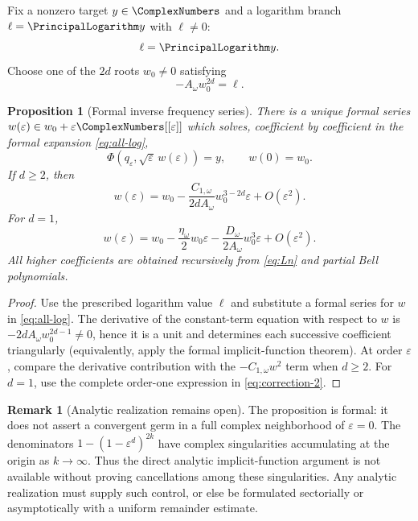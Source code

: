 \documentclass[11pt]{article}
\newtheorem{proposition}[theorem]{Proposition}
\theoremstyle{definition}
\newtheorem{remark}[theorem]{Remark}
\newcommand{\eps}{\varepsilon}
\begin{document}
Fix a nonzero target $y\in\ComplexNumbers$ and a logarithm branch $\ell=\PrincipalLogarithm y$ with $\ell\ne0$:
\begin{equation}
 \ell=\PrincipalLogarithm y.
 \label{eq:ell}
\end{equation}
Choose one of the $2d$ roots $w_0\ne0$ satisfying
\begin{equation}
 -A_\omega w_0^{2d}=\ell.
 \label{eq:w0}
\end{equation}

\begin{proposition}[Formal inverse frequency series]
There is a unique formal series
$w(\eps)\in w_0+\eps\ComplexNumbers[[\eps]]$ which solves, coefficient by coefficient in
the formal expansion \cref{eq:all-log},
\begin{equation}
 \Phi(q_\eps,\sqrt\eps\,w(\eps))=y,
 \qquad
 w(0)=w_0.
 \label{eq:inverse-w}
\end{equation}
If $d\ge2$, then
\begin{equation}
 \boxed{
 w(\eps)=w_0
 -\frac{C_{1,\omega}}{2dA_\omega}
 w_0^{3-2d}\eps+O(\eps^2).}
 \label{eq:w-first}
\end{equation}
For $d=1$,
\begin{equation}
 w(\eps)=w_0-\frac{\eta_\omega}{2}w_0\eps
 -\frac{D_\omega}{2A_\omega}w_0^3\eps+O(\eps^2).
 \label{eq:w-first-d1}
\end{equation}
All higher coefficients are obtained recursively from \cref{eq:Ln} and partial Bell polynomials.
\end{proposition}

\begin{proof}
Use the prescribed logarithm value $\ell$ and substitute a formal series for
$w$ in \cref{eq:all-log}.  The derivative of the constant-term equation with
respect to $w$ is
\(
 -2dA_\omega w_0^{2d-1}\ne0
\), hence it is a unit and determines each successive coefficient
triangularly (equivalently, apply the formal implicit-function theorem).  At
order $\eps$, compare the derivative contribution with the
$-C_{1,\omega}w^2$ term when $d\ge2$.  For $d=1$, use the complete order-one
expression in \cref{eq:correction-2}.
\end{proof}

\begin{remark}[Analytic realization remains open]
The proposition is formal: it does not assert a convergent germ in a full
complex neighborhood of $\eps=0$.  The denominators
$1-(1-\eps^d)^{2k}$ have complex singularities accumulating at the origin as
$k\to\infty$.  Thus the direct analytic implicit-function argument is not
available without proving cancellations among these singularities.  Any
analytic realization must supply such control, or else be formulated
sectorially or asymptotically with a uniform remainder estimate.
\end{remark}
\end{document}
